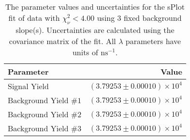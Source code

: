 
\begin{table}
    \begin{center}
        \begin{tabular}{lr}\toprule
            Parameter & Value \\\midrule
            Signal Yield & $(3.79253 \pm 0.00010) \times 10^{4}$ \\
            Background Yield $\#1$ & $(3.79253 \pm 0.00010) \times 10^{4}$ \\
            Background Yield $\#2$ & $(3.79253 \pm 0.00010) \times 10^{4}$ \\
            Background Yield $\#3$ & $(3.79253 \pm 0.00010) \times 10^{4}$ \\\bottomrule
        \end{tabular}
        \caption{The parameter values and uncertainties for the sPlot fit of data with $\chi^2_\nu < 4.00$ using 3 fixed background slope(s). Uncertainties are calculated using the covariance matrix of the fit. All $\lambda$ parameters have units of $\si{\nano\second}^{-1}$.}
    \end{center}
\end{table}
